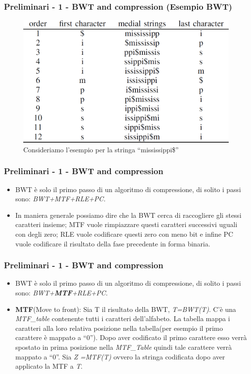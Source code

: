\documentclass{beamer}
\begin{document}
\begin{frame}
\frametitle{Preliminari - 1 - BWT and compression (Esempio BWT)}
 \begin{figure}[H]
 	\centering
 	\includegraphics[scale=0.45]{Immagini/BWTExample}
 	\caption{Consideriamo l'esempio per la stringa ``mississippi\$''}
 \end{figure}
\end{frame}

\begin{frame}
 \frametitle{Preliminari - 1 - BWT and compression}
 \begin{itemize}
 	\item BWT è solo il primo passo di un algoritmo di compressione, di solito i passi sono: \textit{BWT+MTF+RLE+PC.}\pause
 	\item In maniera generale possiamo dire che la BWT cerca di raccogliere gli stessi caratteri insieme; MTF vuole rimpiazzare questi caratteri successivi uguali con degli zero; RLE vuole codificare questi zero con meno bit e infine PC vuole codificare il risultato della fase precedente in forma binaria. 
 \end{itemize}
\end{frame}

\begin{frame}
\frametitle{Preliminari - 1 - BWT and compression}
	\begin{itemize}
		\item BWT è solo il primo passo di un algoritmo di compressione, di solito i passi sono: \textit{BWT+\textbf{MTF}+RLE+PC.}\pause
		\item \textbf{MTF}(Move to front): Sia T il risultato della BWT, \textit{T=BWT(T)}. C'è una \textit{MTF\_table} contenente tutti i caratteri dell'alfabeto. La tabella mappa i caratteri alla loro relativa posizione nella tabella(per esempio il primo carattere è mappato a ``0''). Dopo aver codificato il primo carattere esso verrà spostato in prima posizione nella \textit{MTF\_Table} quindi tale carattere verrà mappato a ``0''. Sia \textit{Z =MTF(T)} ovvero la stringa codificata dopo aver applicato la MTF a \textit{T}.
	\end{itemize}
\end{frame}
\end{document}
